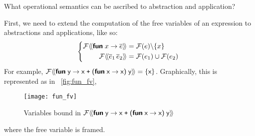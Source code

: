 What operational semantics can be ascribed to abstraction and
application?

First, we need to extend the computation of the free variables of an
expression to abstractions and applications, like so:
\begin{equation*}
\left\{
\begin{aligned}
\mathcal{F} \src{\Xfun \; x \rightarrow \meta{e}} &= 
  \mathcal{F} (e) \backslash \{x\}\\
\mathcal{F} \src{\meta{e}_1 \, \meta{e}_2} &= 
  \mathcal{F} (e_1) \cup \mathcal{F} (e_2)
\end{aligned}
\right.
\end{equation*}
For example, $\mathcal{F} \src{\Xfun \; \ident{y} \rightarrow \ident{x}
\; \texttt{+} \; \lpar\Xfun \; \ident{x} \rightarrow \ident{x}\rpar{}
\; \ident{y}} = \{\ident{x}\}$. Graphically, this is represented as in
\fig~\vref{fig:fun_fv},
\begin{figure}
\centering
\texttt{[image: fun\_fv]}
\caption{Variables bound in $\mathcal{F} \src{\Xfun \; \ident{y}
    \rightarrow \ident{x} \; \texttt{+} \; \lpar\Xfun \; \ident{x}
  \rightarrow \ident{x}\rpar{} \; \ident{y}}$
\label{fig:fun_fv}}
\end{figure}
where the free variable is framed.



